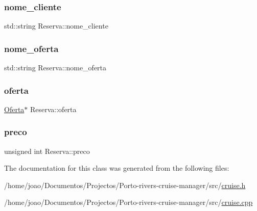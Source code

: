 \subsubsection{\texorpdfstring{nome\+\_\+cliente}{nome\_cliente}}
{\footnotesize\ttfamily std\+::string Reserva\+::nome\+\_\+cliente\hspace{0.3cm}{\ttfamily [private]}}

\mbox{\label{classReserva_a7cb648fed343e3c91e6596a6c30f729e}} 
\subsubsection{\texorpdfstring{nome\+\_\+oferta}{nome\_oferta}}
{\footnotesize\ttfamily std\+::string Reserva\+::nome\+\_\+oferta\hspace{0.3cm}{\ttfamily [private]}}

\mbox{\label{classReserva_a7e783c52d11f78b8a4b50f4de59e290b}} 
\subsubsection{\texorpdfstring{oferta}{oferta}}
{\footnotesize\ttfamily \hyperlink{classOferta}{Oferta}$\ast$ Reserva\+::oferta\hspace{0.3cm}{\ttfamily [private]}}

\mbox{\label{classReserva_afa645221f6e786e34c15dea5984133f6}} 
\subsubsection{\texorpdfstring{preco}{preco}}
{\footnotesize\ttfamily unsigned int Reserva\+::preco\hspace{0.3cm}{\ttfamily [private]}}



The documentation for this class was generated from the following files\+:\begin{DoxyCompactItemize}
\item 
/home/joao/\+Documentos/\+Projectos/\+Porto-\/rivers-\/cruise-\/manager/src/\hyperlink{cruise_8h}{cruise.\+h}\item 
/home/joao/\+Documentos/\+Projectos/\+Porto-\/rivers-\/cruise-\/manager/src/\hyperlink{cruise_8cpp}{cruise.\+cpp}\end{DoxyCompactItemize}
